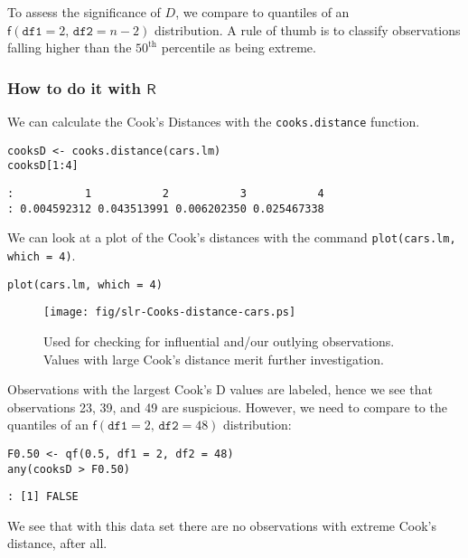 To assess the significance of \(D\), we compare to quantiles of an
\(\mathsf{f}(\mathtt{df1}=2,\,\mathtt{df2}=n-2)\) distribution. A rule
of thumb is to classify observations falling higher than the
\(50^{\mathrm{th}}\) percentile as being extreme.

\subsubsection{How to do it with \(\mathsf{R}\)}
\label{sec-11-5-4-3}

We can calculate the Cook's Distances with the \texttt{cooks.distance}
function.

\begin{verbatim}
cooksD <- cooks.distance(cars.lm)
cooksD[1:4]
\end{verbatim}

\begin{verbatim}
:           1           2           3           4 
: 0.004592312 0.043513991 0.006202350 0.025467338
\end{verbatim}

We can look at a plot of the Cook's distances with the command
\texttt{plot(cars.lm, which = 4)}.

\begin{verbatim}
plot(cars.lm, which = 4)
\end{verbatim}

\begin{figure}[ht!]
\centering
\texttt{[image: fig/slr-Cooks-distance-cars.ps]}
\caption[Cook's distances for the \texttt{cars} data]{\label{fig-Cooks-distance-cars}\small Used for checking for influential and/our outlying observations. Values with large Cook's distance merit further investigation.}
\end{figure}

Observations with the largest Cook's D values are labeled, hence we
see that observations 23, 39, and 49 are suspicious. However, we need
to compare to the quantiles of an \( \mathsf{f}(\mathtt{df1} = 2, \,
\mathtt{df2} = 48) \) distribution:

\begin{verbatim}
F0.50 <- qf(0.5, df1 = 2, df2 = 48)
any(cooksD > F0.50)
\end{verbatim}

\begin{verbatim}
: [1] FALSE
\end{verbatim}

We see that with this data set there are no observations with extreme
Cook's distance, after all.

